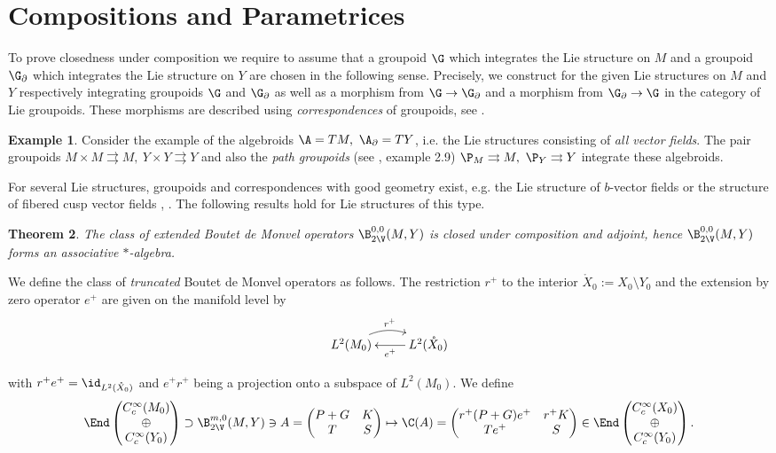 \documentclass[10pt, reqno]{amsart}
\newtheorem{Thm}{Theorem}[section]
\theoremstyle{definition}
\newtheorem{Exa}[Thm]{Example}
\begin{document}
\section{Compositions and Parametrices}

To prove closedness under composition we require to assume that a groupoid $\G$ which integrates the Lie structure on $M$ and a
groupoid $\G_{\partial}$ which integrates the Lie structure on $Y$ are chosen in the following sense.
Precisely, we construct for the given Lie structures on $M$ and $Y$ respectively integrating groupoids $\G$ and $\G_{\partial}$ as well as a morphism from $\G \to \G_{\partial}$ and a morphism from $\G_{\partial} \to \G$ 
in the category of Lie groupoids.
These morphisms are described using \emph{correspondences} of groupoids, see \cite{MO}.
\begin{Exa}
Consider the example of the algebroids $\A = TM, \ \A_{\partial} = TY$, i.e. the Lie structures consisting of \emph{all vector fields}.  
The pair groupoids $M \times M \rightrightarrows M, \ Y \times Y \rightrightarrows Y$ and also the \emph{path groupoids} (see \cite{LN}, example 2.9) $\P_M \rightrightarrows M, \ \P_Y \rightrightarrows Y$ integrate these algebroids. 
\label{Exa:corr}
\end{Exa}
For several Lie structures, groupoids and correspondences with good geometry exist, e.g. the Lie structure of $b$-vector fields or the structure of fibered cusp vector fields \cite{B}, \cite{B2}.
The following results hold for Lie structures of this type.

\begin{Thm}
The class of extended Boutet de Monvel operators $\B_{2\V}^{0,0}(M, Y)$ is closed under composition and adjoint, hence
$\B_{2\V}^{0,0}(M, Y)$ forms an associative $\ast$-algebra. 
\label{Thm:closed1} 
\end{Thm}

We define the class of \emph{truncated} Boutet de Monvel operators as follows.
The restriction $r^+$ to the interior $\mathring{X}_0 := X_0 \setminus Y_0$ and the extension by zero operator $e^+$ are given on the manifold level by
\[
\xymatrix{
L^2(M_0) \ar@/^1pc/[r]^{r^{+}} & \ar@/-0pc/[l]^-{e^{+}} L^2(\mathring{X}_0) 
} 
\]

with $r^{+} e^{+} = \id_{L^2(\mathring{X}_0)}$ and $e^{+} r^{+}$ being a projection onto a subspace of $L^2(M_0)$.
We define
\[
\End\begin{pmatrix} C_c^{\infty}(M_0) \\ \oplus \\ C_c^{\infty}(Y_0) \end{pmatrix} \supset \B_{2\V}^{m,0}(M, Y) \ni A = \begin{pmatrix} P + G & K \\ T & S \end{pmatrix} \mapsto \C(A) = \begin{pmatrix} r^{+} (P + G) e^{+} & r^{+} K \\ T e^{+} & S \end{pmatrix} \in \End\begin{pmatrix} C_c^{\infty}(X_0) \\ \oplus \\ C_c^{\infty}(Y_0) \end{pmatrix}.
\]
\end{document}

